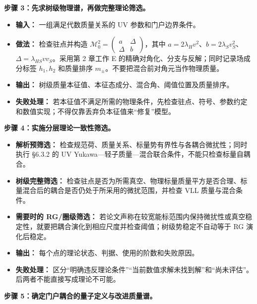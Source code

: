 \documentclass[
]{article}
\providecommand{\tightlist}{%
  \setlength{\itemsep}{0pt}\setlength{\parskip}{0pt}}
\begin{document}
\textbf{步骤 3：先求树级物理谱，再做完整理论筛选。}

\begin{itemize}
\tightlist
\item
  \textbf{输入：} 一组满足代数质量关系的 UV 参数和门户边界条件。
\item
  \textbf{做法：} 检查驻点并构造
  \(\mathcal M_0^2=\begin{pmatrix}a&\Delta\\\Delta&b\end{pmatrix}\)，其中
  \(a=2\lambda_Hv^2\)、\(b=2\lambda_Sv_S^2\)、\(\Delta=\lambda_{HS}vv_S\)。采用第
  2 章工作 E 的精确对角化、分支与反解；同时记录场成分标签 \(h_1,h_2\)
  和质量排序 \(m_\pm\)。不要把混合前对角元当作物理质量。
\item
  \textbf{输出：}
  树级质量本征值、本征态成分、混合角、阈值位置及质量排序。
\item
  \textbf{失败处理：}
  若本征值不满足所需的物理条件，先检查驻点、符号、参数约定和数值实现；不得仅靠丢弃负本征值来``修复''模型。
\end{itemize}

\textbf{步骤 4：实施分层理论一致性筛选。}

\begin{itemize}
\tightlist
\item
  \textbf{解析预筛选：}
  检查规范荷、质量关系、标量势有界性与各耦合微扰性；同时执行 §6.3.2 的
  UV Yukawa---轻子质量---混合联合条件，不能只检查标量自耦合。
\item
  \textbf{树级完整筛选：}
  检查驻点是否为所需真空、物理标量质量平方是否合理、标量混合后的耦合是否仍处于所采用的微扰范围，并检查
  VLL 质量与混合条件。
\item
  \textbf{需要时的 RG/圈级筛选：}
  若论文声称在较宽能标范围内保持微扰性或真空稳定性，就要把耦合演化到相应尺度并检查阈值；树级势稳定不自动等于
  RG 演化后稳定。
\item
  \textbf{输出：} 每个点的理论状态、判据、使用的阶数和失败原因。
\item
  \textbf{失败处理：}
  区分``明确违反理论条件''``当前数值求解未找到解''和``尚未评估''。后两者不能直接写成理论不可能。
\end{itemize}

\textbf{步骤 5：确定门户耦合的量子定义与改进质量谱。}
\end{document}
